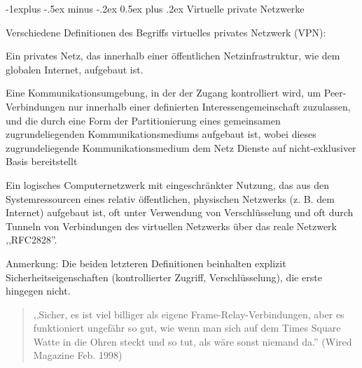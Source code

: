 \documentclass[a4paper]{article}
\makeatletter
\renewcommand{\subsection}{\@startsection{subsection}{2}{0mm}%
 {-1explus -.5ex minus -.2ex}%
 {0.5ex plus .2ex}%
 {\normalfont\normalsize\bfseries}}
\makeatother
\begin{document}
\begin{multicols}{3}
      \subsection{Virtuelle private Netzwerke}
      \begin{itemize*}
            \item Verschiedene Definitionen des Begriffs virtuelles privates Netzwerk (VPN):
            \begin{itemize*}
                  \item Ein privates Netz, das innerhalb einer öffentlichen Netzinfrastruktur, wie dem globalen Internet, aufgebaut ist.
                  \item Eine Kommunikationsumgebung, in der der Zugang kontrolliert wird, um Peer-Verbindungen nur innerhalb einer definierten Interessengemeinschaft zuzulassen, und die durch eine Form der Partitionierung eines gemeinsamen zugrundeliegenden Kommunikationsmediums aufgebaut ist, wobei dieses zugrundeliegende Kommunikationsmedium dem Netz Dienste auf nicht-exklusiver Basis bereitstellt
                  \item Ein logisches Computernetzwerk mit eingeschränkter Nutzung, das aus den Systemressourcen eines relativ öffentlichen, physischen Netzwerks (z. B. dem Internet) aufgebaut ist, oft unter Verwendung von Verschlüsselung und oft durch Tunneln von Verbindungen des virtuellen Netzwerks über das reale Netzwerk ,,RFC2828''.
                  \item Anmerkung: Die beiden letzteren Definitionen beinhalten explizit Sicherheitseigenschaften (kontrollierter Zugriff, Verschlüsselung), die erste hingegen nicht.
            \end{itemize*}
      \end{itemize*}

      \begin{quote}
            ,,Sicher, es ist viel billiger als eigene Frame-Relay-Verbindungen, aber
            es funktioniert ungefähr so gut, wie wenn man sich auf dem Times Square
            Watte in die Ohren steckt und so tut, als wäre sonst niemand da.''
            (Wired Magazine Feb. 1998)
      \end{quote}


\end{multicols}
\end{document}
